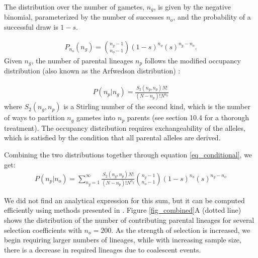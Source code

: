 \documentclass[9pt,twocolumn,twoside,lineno]{gsajnl}
\begin{document}
The distribution over the number of gametes, $n_g$, is given by the negative binomial,
parameterized by the number of successes $n_o$, and the probability of a successful draw is $1-s$.

\begin{equation}
  \begin{aligned}
    \label{eq_neg_binomial_trials}
    P_{n_o}(n_g) = \binom{n_g-1}{n_o-1}(1-s)^{n_o}(s)^{n_g-n_o}.
  \end{aligned}
\end{equation}
Given $n_g$, the number of parental lineages $n_p$ follows the modified occupancy distribution
(also known as the Arfwedson distribution) \citep{Wakeley2009,ONeill2019,JohnsonEtAl2005}:

\begin{equation}
  \begin{aligned}
    \label{eq_occupancy}
    P(n_p|n_g) = \frac{S_2(n_g,n_p) N!}{(N-n_p)! N^{n_g}}
  \end{aligned}
\end{equation}
where $S_2(n_g,n_p)$ is a Stirling number of the second kind, which is the number of ways to
partition $n_g$ gametes into $n_p$ parents (see \cite{JohnsonEtAl2005} section 10.4 for a thorough
treatment).
The occupancy distribution requires exchangeability of the alleles, which is satisfied by the
condition that all parental alleles are derived.

Combining the two distributions together through equation \ref{eq_conditional}, we get:
\begin{equation}
  \begin{aligned}
    \label{eq_lineages_in_past}
    P(n_p|n_o) = \sum_{n_g=1}^{\infty} \frac{S_2(n_g,n_p) N!}{(N-n_p)! N^{n_g}} \binom{n_g-1}{n_o-1}(1-s)^{n_o}(s)^{n_g-n_o}
  \end{aligned}
\end{equation}

We did not find an analytical expression for this sum, but it can be computed
efficiently using methods presented in \citep{ONeill2019}. Figure \ref{fig_combined}A (dotted line) shows
the distribution of the number of contributing parental lineages for several selection coefficients
with $n_o=200$.
As the strength of selection
is increased, we begin requiring larger numbers of lineages, while with increasing sample size,
there is a decrease in required lineages due to coalescent events.
\end{document}
